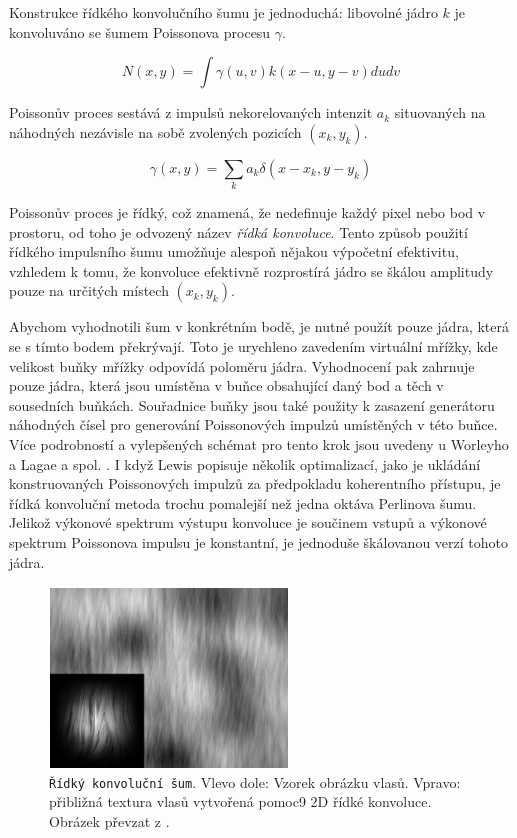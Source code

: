 Konstrukce řídkého konvolučního šumu je jednoduchá: libovolné jádro $k$ je konvoluváno se šumem Poissonova procesu $\gamma$.

\[N(x,y) = \int\gamma(u,v)k(x-u,y-v)dudv\]

Poissonův proces sestává z impulsů nekorelovaných intenzit $a_k$ situovaných na náhodných nezávisle na sobě zvolených pozicích $(x_k,y_k)$.

\[\gamma(x,y) = \sum_k a_k \delta(x-x_k,y-y_k)\]

Poissonův proces je řídký, což znamená, že nedefinuje každý pixel nebo bod v prostoru, od toho je odvozený název \textit{řídká konvoluce}. Tento způsob použití řídkého impulsního šumu umožňuje alespoň nějakou výpočetní efektivitu, vzhledem k tomu, že konvoluce efektivně rozprostírá jádro se škálou amplitudy pouze na určitých místech $(x_k, y_k)$.

Abychom vyhodnotili šum v konkrétním bodě, je nutné použít pouze jádra, která se s tímto bodem překrývají. Toto je urychleno zavedením virtuální mřížky, kde velikost buňky mřížky odpovídá poloměru jádra. Vyhodnocení pak zahrnuje pouze jádra, která jsou umístěna v buňce obsahující daný bod a těch v sousedních buňkách. Souřadnice buňky jsou také použity k zasazení generátoru náhodných čísel pro generování Poissonových impulzů umístěných v této buňce. Více podrobností a vylepšených schémat pro tento krok jsou uvedeny u Worleyho \cite{worley1996} a Lagae a spol. \cite{Lagae09}. I když Lewis \cite{Lewis89} popisuje několik optimalizací, jako je ukládání konstruovaných Poissonových impulzů za předpokladu koherentního přístupu, je řídká konvoluční metoda trochu pomalejší než jedna oktáva Perlinova šumu. Jelikož výkonové spektrum výstupu konvoluce je součinem vstupů a výkonové spektrum Poissonova impulsu je konstantní, je jednoduše škálovanou verzí tohoto jádra.

\begin{figure}[H]
	\centering
	\includegraphics[scale=1]{obrazky-figures/SparseConvolutionNoise.png}
	\caption{\texttt{Řídký konvoluční šum}. Vlevo dole: Vzorek obrázku vlasů. Vpravo: přibližná textura vlasů vytvořená pomoc9 2D řídké konvoluce. Obrázek převzat z \cite{Lagae10}.}
	\label{fig:SparseConvolutionNoise}
\end{figure}


